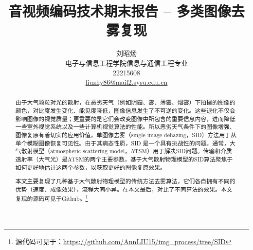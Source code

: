 \documentclass[fontset=windows]{article}
\title{音视频编码技术期末报告 -- 多类图像去雾复现}
\author{%
    刘昭炀\\ %
    电子与信息工程学院\quad 信息与通信工程专业\\
    22215608\\
    \href{mailto:liuzhy86@mail2.sysu.edu.cn}{liuzhy86@mail2.sysu.edu.cn}\\
}
\begin{document}
{

\maketitle

\begin{abstract}
    \indent 由于大气颗粒对光的散射，在恶劣天气（例如阴霾、雾、薄雾、烟雾）下拍摄的图像的颜色，对比度发生变化、能见度降低，图像信息发生了不可逆的变化。这些退化不仅会影响图像的视觉质量；更重要的是它们会改变图像中所包含的重要信息内容，进而降低一些室外视觉系统以及一些计算机视觉算法的性能。所以恶劣天气条件下的图像增强、图像复原有着切实的应用价值。单图像去雾（single image dehazing，SID）方法用于从单个模糊图像恢复可见性。由于其病态性质，SID 是一个具有挑战性的问题。通常，大气散射模型（atmospheric scattering model，ATSM）用于解决SID问题。传输和介质透射率（大气光）是ATSM的两个主要参数，基于大气散射物理模型的SID算法聚焦于如何更好地估计这两个参数，以获取更好的图像复原效果。

    \indent 本文主要复现了几种基于大气散射物理模型的传统方法去雾算法，它们各自拥有不同的优势（速度、成像效果），流程大同小异。在本文最后，对比了不同算法的效果。本文复现的源码可见于Github。\footnote{源代码可见于：\url{https://github.com/AnnLIU15/img_process/tree/SID}}
\end{abstract}

\begingroup
\let\clearpage\relax





\endgroup

\medskip
{\small{}

}{\small\par}






\end{document}
